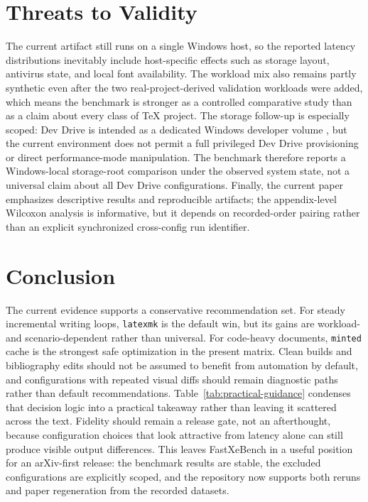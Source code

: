 \documentclass[11pt]{article}
\begin{document}
\section{Threats to Validity}
The current artifact still runs on a single Windows host, so the reported latency distributions inevitably include host-specific effects such as storage layout, antivirus state, and local font availability. The workload mix also remains partly synthetic even after the two real-project-derived validation workloads were added, which means the benchmark is stronger as a controlled comparative study than as a claim about every class of TeX project. The storage follow-up is especially scoped: Dev Drive is intended as a dedicated Windows developer volume \cite{ms-devdrive}, but the current environment does not permit a full privileged Dev Drive provisioning or direct performance-mode manipulation. The benchmark therefore reports a Windows-local storage-root comparison under the observed system state, not a universal claim about all Dev Drive configurations. Finally, the current paper emphasizes descriptive results and reproducible artifacts; the appendix-level Wilcoxon analysis is informative, but it depends on recorded-order pairing rather than an explicit synchronized cross-config run identifier.

\section{Conclusion}
The current evidence supports a conservative recommendation set. For steady incremental writing loops, \texttt{latexmk} is the default win, but its gains are workload- and scenario-dependent rather than universal. For code-heavy documents, \texttt{minted} cache is the strongest safe optimization in the present matrix. Clean builds and bibliography edits should not be assumed to benefit from automation by default, and configurations with repeated visual diffs should remain diagnostic paths rather than default recommendations. Table~\ref{tab:practical-guidance} condenses that decision logic into a practical takeaway rather than leaving it scattered across the text. Fidelity should remain a release gate, not an afterthought, because configuration choices that look attractive from latency alone can still produce visible output differences. This leaves FastXeBench in a useful position for an arXiv-first release: the benchmark results are stable, the excluded configurations are explicitly scoped, and the repository now supports both reruns and paper regeneration from the recorded datasets.
\end{document}
